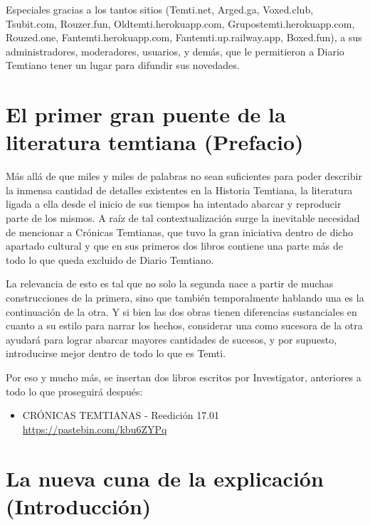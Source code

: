 \documentclass[
]{book}
\providecommand{\tightlist}{%
  \setlength{\itemsep}{0pt}\setlength{\parskip}{0pt}}
\begin{document}
Especiales gracias a los tantos sitios (Temti.net, Arged.ga, Voxed.club, Tsubit.com, Rouzer.fun, Oldtemti.herokuapp.com, Grupostemti.herokuapp.com, Rouzed.one, Fantemti.herokuapp.com, Fantemti.up.railway.app, Boxed.fun), a sus administradores, moderadores, usuarios, y demás, que le permitieron a Diario Temtiano tener un lugar para difundir sus novedades.

\hypertarget{el-primer-gran-puente-de-la-literatura-temtiana-prefacio}{%
\chapter{El primer gran puente de la literatura temtiana (Prefacio)}\label{el-primer-gran-puente-de-la-literatura-temtiana-prefacio}}

Más allá de que miles y miles de palabras no sean suficientes para poder describir la inmensa cantidad de detalles existentes en la Historia Temtiana, la literatura ligada a ella desde el inicio de sus tiempos ha intentado abarcar y reproducir parte de los mismos. A raíz de tal contextualización surge la inevitable necesidad de mencionar a Crónicas Temtianas, que tuvo la gran iniciativa dentro de dicho apartado cultural y que en sus primeros dos libros contiene una parte más de todo lo que queda excluido de Diario Temtiano.

La relevancia de esto es tal que no solo la segunda nace a partir de muchas construcciones de la primera, sino que también temporalmente hablando una es la continuación de la otra. Y si bien las dos obras tienen diferencias sustanciales en cuanto a su estilo para narrar los hechos, considerar una como sucesora de la otra ayudará para lograr abarcar mayores cantidades de sucesos, y por supuesto, introducirse mejor dentro de todo lo que es Temti.

Por eso y mucho más, se insertan dos libros escritos por Investigator, anteriores a todo lo que proseguirá después:

\begin{itemize}
\tightlist
\item
  CRÓNICAS TEMTIANAS - Reedición 17.01 \url{https://pastebin.com/kbu6ZYPq}
\end{itemize}

\hypertarget{la-nueva-cuna-de-la-explicaciuxf3n-introducciuxf3n}{%
\chapter{La nueva cuna de la explicación (Introducción)}\label{la-nueva-cuna-de-la-explicaciuxf3n-introducciuxf3n}}
\end{document}
